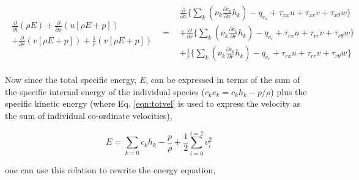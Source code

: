 \begin{displaymath}
	\begin{array}{ccc}
		\begin{array}{c}
		\frac{\partial}{\partial t}(\rho E) +\frac{\partial}{\partial x}(u[\rho E + p]) \\
		+ \frac{\partial}{\partial r}(v[\rho E + p]) + \frac{1}{r}(v[\rho E + p])
		\end{array} & = &
		\begin{array}{c}
			\frac{\partial}{\partial x}\Big\{
			\sum_k (\nu_k \frac{\partial c_k}{\partial x}h_k) 
			- q_{c_x} +   \tau_{xx}u + \tau_{xr}v + \tau_{x\theta}w\Big\} \\
			+ \frac{\partial}{\partial r}\Big\{
			\sum_k (\nu_k \frac{\partial c_k}{\partial r}h_k)
			-  q_{c_r} + \tau_{rx}u +  \tau_{rr}v  + \tau_{r\theta}w\Big\} \\
			+\frac{1}{r}\Big\{\sum_k (\nu_k \frac{\partial c_k}{\partial r}h_k) - q_{c_r} + \tau_{rx}u 
			+ \tau_{rr}v + \tau_{r\theta}w\Big\}
		\end{array}  
	\end{array}
\end{displaymath}
	
	Now since the total specific energy, $E$, can be expressed in terms of the sum of the specific internal energy
of the individual species ($c_k e_k = c_k h_k -p/\rho$) plus the specific kinetic energy (where Eq. \ref{eqn:totvel}
is used to express the velocity as the sum of individual co-ordinate velocities),

\begin{equation}
	E = \sum_{k=0}c_k h_k - \frac{p}{\rho} + \frac{1}{2}\sum_{i=0}^{i=2}v_i^2
\label{eqn:spenergy2}
\end{equation} 
	
	one can use this relation to rewrite the energy equation,

